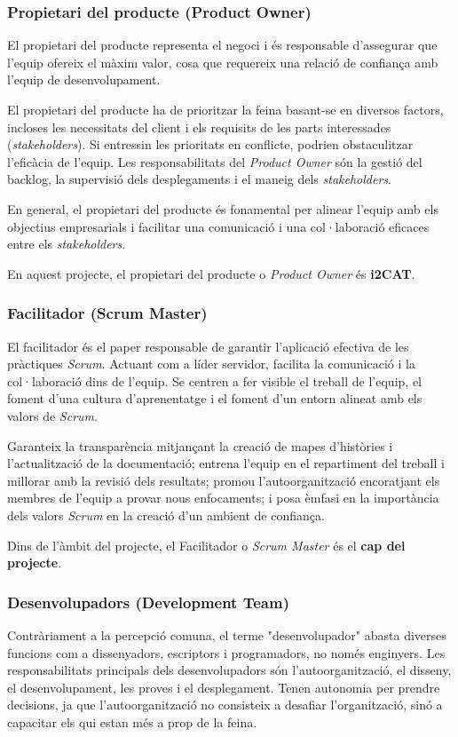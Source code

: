 \subsubsection{Propietari del producte (Product Owner)}
El propietari del producte representa el negoci i és responsable d'assegurar que l'equip ofereix el màxim valor, cosa que requereix una relació de confiança amb l'equip de desenvolupament.

El propietari del producte ha de prioritzar la feina basant-se en diversos factors, incloses les necessitats del client i els requisits de les parts interessades (\textit{stakeholders}). Si entressin les prioritats en conflicte, podrien obstaculitzar l'eficàcia de l'equip. Les responsabilitats del \textit{Product Owner} són la gestió del backlog, la supervisió dels desplegaments i el maneig dels \textit{stakeholders}.

En general, el propietari del producte és fonamental per alinear l'equip amb els objectius empresarials i facilitar una comunicació i una col·laboració eficaces entre els \textit{stakeholders}.

En aquest projecte, el propietari del producte o \textit{Product Owner} és \textbf{i2CAT}.


\subsubsection{Facilitador (Scrum Master)}
El facilitador és el paper responsable de garantir l'aplicació efectiva de les pràctiques \textit{Scrum}. Actuant com a líder servidor, facilita la comunicació i la col·laboració dins de l'equip. Se centren a fer visible el treball de l'equip, el foment d'una cultura d'aprenentatge i el foment d'un entorn alineat amb els valors de \textit{Scrum}.

Garanteix la transparència mitjançant la creació de mapes d'històries i l'actualització de la documentació; entrena l'equip en el repartiment del treball i millorar amb la revisió dels resultats; promou l'autoorganització encoratjant els membres de l'equip a provar nous enfocaments; i posa èmfasi en la importància dels valors \textit{Scrum} en la creació d'un ambient de confiança.

Dins de l'àmbit del projecte, el Facilitador o \textit{Scrum Master} és el \textbf{cap del projecte}.


\subsubsection{Desenvolupadors (Development Team)}
Contràriament a la percepció comuna, el terme "desenvolupador" abasta diverses funcions com a dissenyadors, escriptors i programadors, no només enginyers. Les responsabilitats principals dels desenvolupadors són l'autoorganització, el disseny, el desenvolupament, les proves i el desplegament. Tenen autonomia per prendre decisions, ja que l'autoorganització no consisteix a desafiar l'organització, sinó a capacitar els qui estan més a prop de la feina. 

